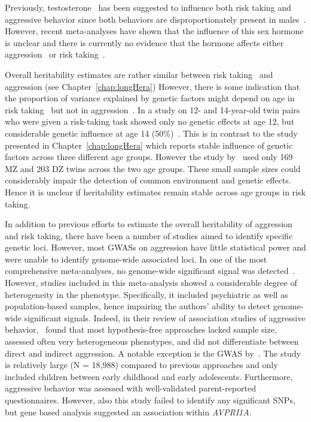 Previously, testosterone~\cite{Vermeersch2008} has been suggested to influence both risk taking and aggressive behavior since both behaviors are disproportionately present in males~\cite{Byrnes1999}.
However, recent meta-analyses have shown that  the influence of this sex hormone is unclear and there is currently no evidence that the hormone affects either aggression~\cite{Archer2005a} or risk taking~\cite{Vermeersch2008}.

Overall heritability estimates are rather similar between risk taking~\cite{Anokhin2009} and aggression (see Chapter~\ref{chap:longHera})
However, there is some indication that the proportion of variance explained by genetic factors might depend on age in risk taking~\cite{Anokhin2009} but not in aggression~\cite{Porsch2016}.
In a study on 12- and 14-year-old twin pairs who were given a risk-taking task showed only no genetic effects at age 12, but considerable genetic influence at age 14 (50\%)~\cite{Anokhin2009}.
This is in contrast to the study presented in Chapter~\ref{chap:longHera} which reports stable influence of genetic factors across three different age groups.
However the study by~\citet{Anokhin2009} used only 169 MZ and 203 DZ twins across the two age groups.
These small sample sizes could considerably impair the detection of common environment and genetic effects. 
Hence it is unclear if heritability estimates remain stable across age groups in risk taking.

In addition to previous efforts to estimate the overall heritability of aggression and risk taking, there have been a number of studies aimed to identify specific genetic loci.
However, most GWASs on aggression have little statistical power and were unable to identify genome-wide associated loci.
In one of the most comprehensive meta-analyses, no genome-wide significant signal was detected~\citet{Vassos2014}.
However, studies included in this meta-analysis showed a considerable degree of heterogeneity in the phenotype.
Specifically, it included psychiatric as well as population-based samples, hence impairing the authors' ability to detect genome-wide significant signals.
Indeed, in their review of association studies of aggressive behavior,~\citet{Fernandez-Castillo2016} found that most hypothesis-free approaches lacked sample size, assessed often very heterogeneous phenotypes, and did not differentiate between direct and indirect aggression. 
A notable exception is the GWAS by~\citet{Pappa2016a}.
The study is relatively large (N = 18,988) compared to previous approaches and only included children between early childhood and early adolescents.
Furthermore, aggressive behavior was assessed with well-validated parent-reported questionnaires. 
However, also this study failed to identify any significant SNPs, but gene based analysis suggested an association within \textit{AVPRI1A}.

